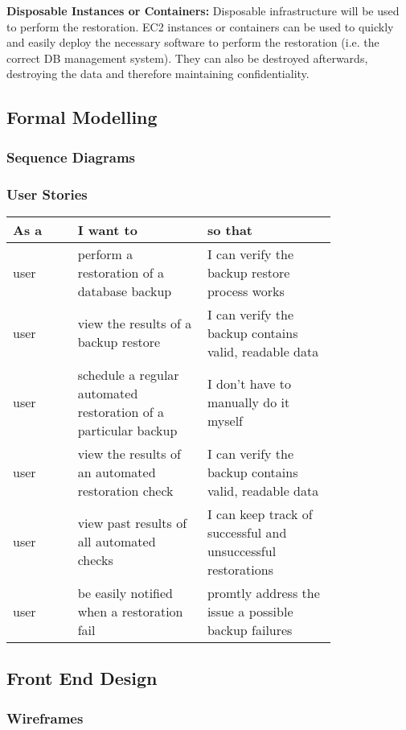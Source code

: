 	\noindent\textbf{Disposable Instances or Containers:} Disposable infrastructure will be used to perform the restoration. EC2 instances or containers can be used to quickly and easily deploy the necessary software to perform the restoration (i.e. the correct DB management system). They can also be destroyed afterwards, destroying the data and therefore maintaining confidentiality. 
	
	\subsection{Formal Modelling}
		\subsubsection{Sequence Diagrams}
		\subsubsection{User Stories}		
		\begin{tabular}{|l|p{0.4\linewidth}|p{0.4\linewidth}|} \hline
			\textbf{As a} & \textbf{I want to} & \textbf{so that} \\ \hline
			user & perform a restoration of a database backup & I can verify the backup restore process works \\ \hline
			user & view the results of a backup restore & I can verify the backup contains valid, readable data \\ \hline
			user & schedule a regular automated restoration of a particular backup & I don't have to manually do it myself \\ \hline
			user & view the results of an automated restoration check & I can verify the backup contains valid, readable data \\ \hline
			user & view past results of all automated checks & I can keep track of successful and unsuccessful restorations \\ \hline
			user & be easily notified when a restoration fail & promtly address the issue a possible backup failures \\  \hline
		\end{tabular}
	\subsection{Front End Design}
		\subsubsection{Wireframes}